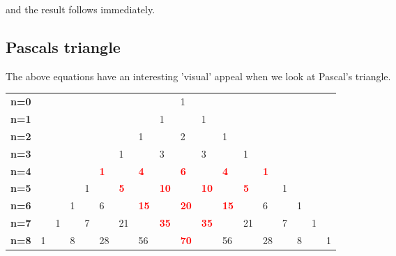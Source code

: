 \documentclass[a4paper,10pt]{article}
\begin{document}
\begin{flushleft}
and the result follows immediately.

\clearpage
\subsection{Pascals triangle}

The above equations have an interesting 'visual' appeal when we look at Pascal's triangle.

\begin{table}[!hbp]
\begin{tabular}{llllllllllllllllll}
\textbf{n=0} &   &   &   &   &            &            &             &             & 1           &             &             &            &            &   &   &   &   \\
\textbf{n=1} &   &   &   &   &            &            &             & 1           &             & 1           &             &            &            &   &   &   &   \\
\textbf{n=2} &   &   &   &   &            &            & 1           &             & 2           &             & 1           &            &            &   &   &   &   \\
\textbf{n=3} &   &   &   &   &            & 1          &             & 3           &             & 3           &             & 1          &            &   &   &   &   \\
\textbf{n=4} &   &   &   &   & \textcolor{red}{\textbf{1}} &            & \textcolor{red}{\textbf{4}}  &             & \textcolor{red}{\textbf{6}}  &             & \textcolor{red}{\textbf{4}}  &            & \textcolor{red}{\textbf{1}} &   &   &   &   \\
\textbf{n=5} &   &   &   & 1 &            & \textcolor{red}{\textbf{5}} &             & \textcolor{red}{\textbf{10}} &             & \textcolor{red}{\textbf{10}} &             & \textcolor{red}{\textbf{5}} &            & 1 &   &   &   \\
\textbf{n=6} &   &   & 1 &   & 6          &            & \textcolor{red}{\textbf{15}} &             & \textcolor{red}{\textbf{20}} &             & \textcolor{red}{\textbf{15}} &            & 6          &   & 1 &   &   \\
\textbf{n=7} &   & 1 &   & 7 &            & 21         &             & \textcolor{red}{\textbf{35}} &             & \textcolor{red}{\textbf{35}} &             & 21         &            & 7 &   & 1 &   \\
\textbf{n=8} & 1 &   & 8 &   & 28         &            & 56          &             & \textcolor{red}{\textbf{70}} &             & 56          &            & 28         &   & 8 &   & 1
\end{tabular}
\end{table}


\end{flushleft}
\end{document}
